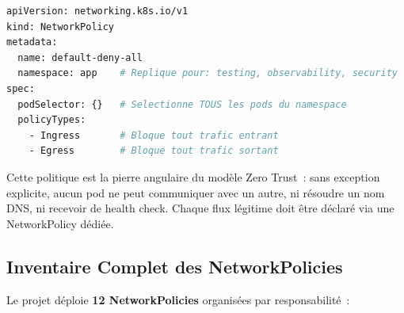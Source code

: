 \begin{lstlisting}[language=bash, caption=Politique default-deny appliquée à chaque namespace]
apiVersion: networking.k8s.io/v1
kind: NetworkPolicy
metadata:
  name: default-deny-all
  namespace: app    # Replique pour: testing, observability, security
spec:
  podSelector: {}   # Selectionne TOUS les pods du namespace
  policyTypes:
    - Ingress       # Bloque tout trafic entrant
    - Egress        # Bloque tout trafic sortant
\end{lstlisting}

Cette politique est la pierre angulaire du modèle Zero Trust~: sans exception explicite,
aucun pod ne peut communiquer avec un autre, ni résoudre un nom DNS, ni recevoir de
health check. Chaque flux légitime doit être déclaré via une NetworkPolicy dédiée.

\subsection{Inventaire Complet des NetworkPolicies}

Le projet déploie \textbf{12 NetworkPolicies} organisées par responsabilité~:

